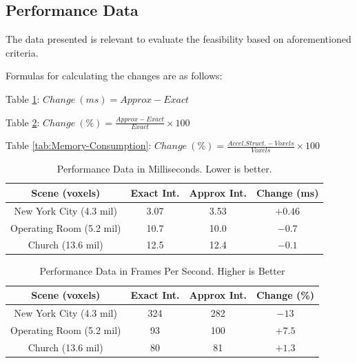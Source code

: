 \documentclass[12pt]{article}
\begin{document}
\subsection{Performance Data}

The data presented is relevant to evaluate the feasibility based on aforementioned criteria.

Formulas for calculating the changes are as follows:

Table \ref{tab:Performance-Milliseconds}:
$Change ~ (ms) = Approx - Exact$

Table \ref{tab:Performance-Frames}:
$Change ~ (\%) = \frac{Approx - Exact}{Exact} \times 100$

Table \ref{tab:Memory-Consumption}:
$Change ~ (\%) = \frac{Accel. Struct. - Voxels}{Voxels} \times 100$

\begin{table}[H]
    \centering
    \caption{Performance Data in Milliseconds. Lower is better.}
    \vspace{0.5cm}
    \label{tab:Performance-Milliseconds}
    \begin{tabular}{c||c|c|c|}
        Scene (voxels)           & Exact Int. & Approx Int. & Change (ms) \\ \toprule
        New York City (4.3 mil)  & 3.07       & 3.53        & $ +0.46 $   \\
        Operating Room (5.2 mil) & 10.7       & 10.0        & $ -0.7  $   \\
        Church (13.6 mil)        & 12.5       & 12.4        & $ -0.1  $   \\
    \end{tabular}
\end{table}

\begin{table}[H]
    \centering
    \caption{Performance Data in Frames Per Second. Higher is Better}
    \vspace{0.5cm}
    \label{tab:Performance-Frames}
    \begin{tabular}{c||c|c|c|}
        Scene (voxels)           & Exact Int. & Approx Int. & Change (\%) \\ \toprule
        New York City (4.3 mil)  & 324        & 282         & $ -13  $    \\
        Operating Room (5.2 mil) & 93         & 100         & $ +7.5 $    \\
        Church (13.6 mil)        & 80         & 81          & $ +1.3 $    \\
    \end{tabular}
\end{table}
\end{document}
